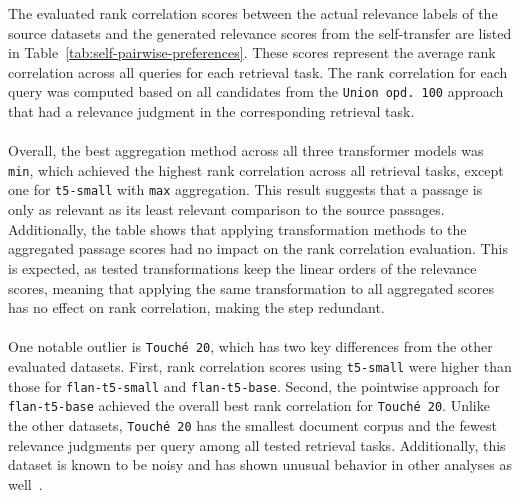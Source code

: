 The evaluated rank correlation scores between the actual relevance labels of the source datasets and the generated relevance scores from the self-transfer are listed in Table~\ref{tab:self-pairwise-preferences}. These scores represent the average rank correlation across all queries for each retrieval task. The rank correlation for each query was computed based on all candidates from the \texttt{Union opd.\ 100} approach that had a relevance judgment in the corresponding retrieval task.
\\\\
Overall, the best aggregation method across all three transformer models was \texttt{min}, which achieved the highest rank correlation across all retrieval tasks, except one for \texttt{t5-small} with \texttt{max} aggregation. This result suggests that a passage is only as relevant as its least relevant comparison to the source passages. Additionally, the table shows that applying transformation methods to the aggregated passage scores had no impact on the rank correlation evaluation. This is expected, as tested transformations keep the linear orders of the relevance scores, meaning that applying the same transformation to all aggregated scores has no effect on rank correlation, making the step redundant.
\\\\
One notable outlier is \texttt{Touché 20}, which has two key differences from the other evaluated datasets. First, rank correlation scores using \texttt{t5-small} were higher than those for \texttt{flan-t5-small} and \texttt{flan-t5-base}. Second, the pointwise approach for \texttt{flan-t5-base} achieved the overall best rank correlation for \mbox{\texttt{Touché 20}}. Unlike the other datasets, \texttt{Touché 20} has the smallest document corpus and the fewest relevance judgments per query among all tested retrieval tasks. Additionally, this dataset is known to be noisy and has shown unusual behavior in other analyses as well~\citep{thakur:2024}.
